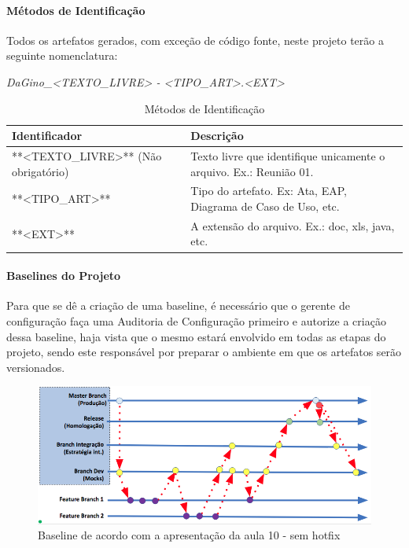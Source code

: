  \paragraph{Métodos de Identificação}

 Todos os artefatos gerados, com exceção de código fonte, neste projeto terão a seguinte nomenclatura:

\begin{myprop}
\textit{DaGino\_<TEXTO\_LIVRE> - <TIPO\_ART>.<EXT>}
\end{myprop}


\begin{table}[H]
      \begin{center}
        \begin{tabular}{| l | p{6cm} |}
        \hline
        \textbf{Identificador} & \textbf{Descrição} \\ \hline
        **<TEXTO\_LIVRE>** (Não obrigatório) & Texto livre que identifique unicamente o arquivo. Ex.: Reunião 01. \\ \hline
        **<TIPO\_ART>** & Tipo do artefato. Ex: Ata, EAP, Diagrama de Caso de Uso, etc. \\ \hline
        **<EXT>** & A extensão do arquivo. Ex.: doc, xls, java, etc. \\ \hline
        \end{tabular}
      \end{center}
    \caption{Métodos de Identificação}
    \end{table}

\paragraph{Baselines do Projeto}

Para que se dê a criação de uma baseline, é necessário que o gerente de configuração faça uma Auditoria de Configuração primeiro e autorize a criação dessa baseline, haja vista que o mesmo estará envolvido em todas as etapas do projeto, sendo este responsável por preparar o ambiente em que os artefatos serão versionados.

\begin{figure}[H]
  \centering
  \includegraphics[width=1\textwidth]{softwareengineer/images/baseline} 
  \caption{Baseline de acordo com a apresentação da aula 10 - sem hotfix}
  \label{fig:baseline} 
\end{figure}


